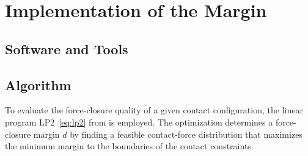 \chapter{Implementation of the Margin}
\label{chap:implementation}

%

\section{Software and Tools}
\label{sec:software}


\section{Algorithm}
\label{sec:algorithm}

To evaluate the force-closure quality of a given contact configuration, the
linear program LP2~\eqref{eq:lp2} from \cite[Sec.~28.4.2]{prattichizzo2008grasping}
is employed. The optimization determines a force-closure margin $d$ by
finding a feasible contact-force distribution that maximizes the minimum
margin to the boundaries of the contact constraints.

